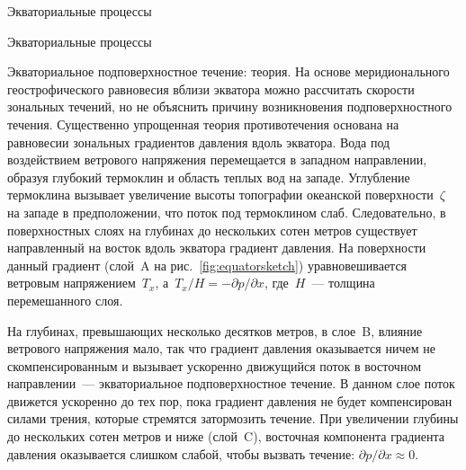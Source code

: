 \begin{chapter}{Экваториальные процессы}
\begin{section}{Экваториальные процессы}
\begin{paragraph}{Экваториальное подповерхностное течение: теория.}
На основе меридионального геострофического равновесия вблизи экватора можно
рассчитать скорости зональных течений, но не объяснить причину возникновения
подповерхностного течения. Существенно упрощенная теория противотечения 
основана на равновесии зональных градиентов давления вдоль экватора. 
Вода под воздействием ветрового напряжения перемещается
в западном направлении, образуя глубокий термоклин 
и область теплых вод на западе. Углубление термоклина%
вызывает увеличение высоты топографии океанской поверхности~$\zeta$ на западе
в предположении, что поток под термоклином слаб.  Следовательно,
в поверхностных слоях на глубинах до нескольких сотен метров существует 
направленный на восток вдоль экватора градиент давления. На поверхности
данный градиент (слой~A на рис.~\ref{fig:equatorsketch}) уравновешивается
ветровым напряжением~$T_x$, 
а~$T_x / H = -\partial p/\partial x$, где~$H$~--- толщина перемешанного слоя.
%

На глубинах, превышающих несколько десятков метров, в слое~B, 
влияние ветрового напряжения мало, так что градиент давления оказывается ничем
не скомпенсированным и вызывает ускоренно движущийся поток в восточном
направлении~--- экваториальное подповерхностное течение. В данном слое
поток движется ускоренно до тех пор, пока градиент давления не будет
компенсирован силами трения, которые стремятся затормозить течение.
При увеличении глубины до нескольких сотен метров и ниже (слой~C), восточная
компонента градиента давления оказывается слишком слабой, чтобы вызвать
течение: $\partial p / \partial x \approx 0$.
% 


\end{paragraph}
\end{section}
\end{chapter}
